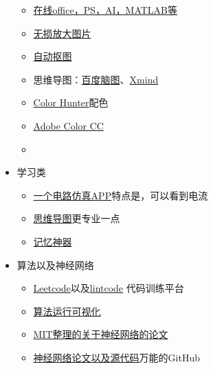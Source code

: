 \documentclass[UTF8]{ctexbook}
\begin{document}
\begin{itemize}
\begin{itemize}
		      \item \href{https://uzer.me/u/signin}{在线office，PS，AI，MATLAB等}
		      \item \href{https://bigjpg.com}{无损放大图片}
		      \item \href{https://www.remove.bg}{自动抠图}
		      \item 思维导图：\href{http://naotu.baidu.com/file/97d9cd5ca30672903a3e3321e62c6ed8}{百度脑图}、\href{https://www.xmind.net/}{Xmind}
		      \item \href{http://www.colorhunter.com}{Color Hunter}\quad 配色
		      \item \href{https://color.adobe.com/zh/create/color-wheel/?base=2&rule=Analogous&selected=0&name=我的%20Color%20主題&mode=rgb&rgbvalues=1,0.8549019607843137,0.598371339694025,0.91,0.33228399543185755,0.04550000000000004,1,0,0,0.8452221384131547,0.04550000000000004,0.91,0.3394492552539419,0.050000000000000044,1&swatchOrder=0,1,2,3,4}{Adobe Color CC}
		      \item
	      \end{itemize}
	\item 学习类
	      \begin{itemize}
		      \item \href{https://www.52pojie.cn/thread-716675-1-1.html}{一个电路仿真APP}\quad 特点是，可以看到电流
		      \item \href{https://mm.edrawsoft.cn/map.html?obj=wxoa3v5wBLcpmgCifx59_Uzk5X4qHU/Personal/未命名文件.emmx}{思维导图}更专业一点
		      \item \href{https://ankiweb.net/shared/decks/}{记忆神器}
	      \end{itemize}
	\item 算法以及神经网络
	      \begin{itemize}
		      \item \href{https://leetcode.com}{Leetcode}以及\href{https://www.lintcode.com/zh-cn/accounts/signup/}{lintcode} 代码训练平台
		      \item \href{https://algorithm-visualizer.org}{算法运行可视化}
		      \item \href{https://www.stateoftheart.ai}{MIT整理的关于神经网络的论文}
		      \item \href{https://github.com/lonelybag/pwc}{神经网络论文以及源代码}\quad 万能的GitHub
	      \end{itemize}
\end{itemize}
\end{document}
